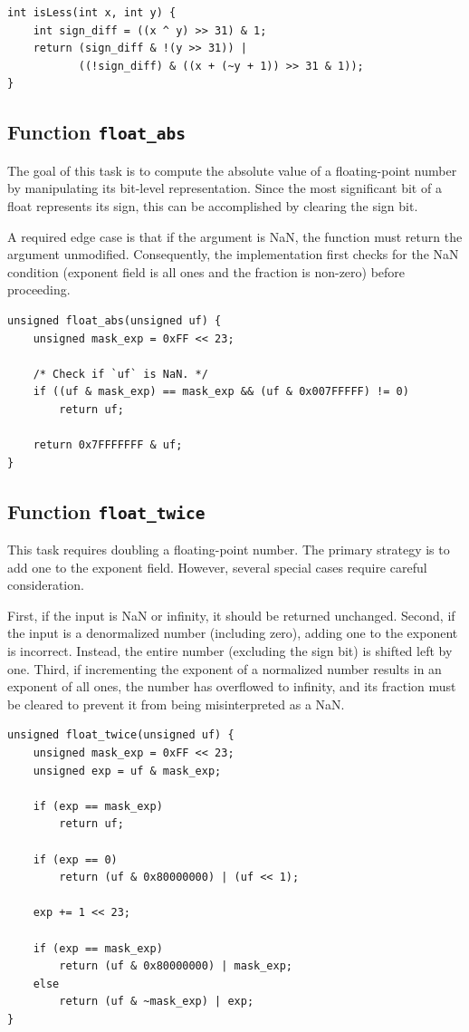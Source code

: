 \documentclass{article}
\begin{document}
\begin{verbatim}
int isLess(int x, int y) {
    int sign_diff = ((x ^ y) >> 31) & 1;
    return (sign_diff & !(y >> 31)) |
           ((!sign_diff) & ((x + (~y + 1)) >> 31 & 1));
}
\end{verbatim}

\subsection{Function \texttt{float\_abs}}

The goal of this task is to compute the absolute value of a floating-point 
number by manipulating its bit-level representation. Since the most significant 
bit of a float represents its sign, this can be accomplished by clearing the 
sign bit.

A required edge case is that if the argument is NaN, the function must return 
the argument unmodified. Consequently, the implementation first checks for the 
NaN condition (exponent field is all ones and the fraction is non-zero) before 
proceeding.

\begin{verbatim}
unsigned float_abs(unsigned uf) {
    unsigned mask_exp = 0xFF << 23;

    /* Check if `uf` is NaN. */
    if ((uf & mask_exp) == mask_exp && (uf & 0x007FFFFF) != 0)
        return uf;

    return 0x7FFFFFFF & uf;
}
\end{verbatim}

\subsection{Function \texttt{float\_twice}}

This task requires doubling a floating-point number. The primary strategy is to 
add one to the exponent field. However, several special cases require careful 
consideration.

First, if the input is NaN or infinity, it should be returned unchanged. Second, 
if the input is a denormalized number (including zero), adding one to the 
exponent is incorrect. Instead, the entire number (excluding the sign bit) is 
shifted left by one. Third, if incrementing the exponent of a normalized number 
results in an exponent of all ones, the number has overflowed to infinity, and 
its fraction must be cleared to prevent it from being misinterpreted as a NaN.

\begin{verbatim}
unsigned float_twice(unsigned uf) {
    unsigned mask_exp = 0xFF << 23;
    unsigned exp = uf & mask_exp;

    if (exp == mask_exp)
        return uf;

    if (exp == 0)
        return (uf & 0x80000000) | (uf << 1);

    exp += 1 << 23;

    if (exp == mask_exp)
        return (uf & 0x80000000) | mask_exp;
    else
        return (uf & ~mask_exp) | exp;
}
\end{verbatim}
\end{document}
